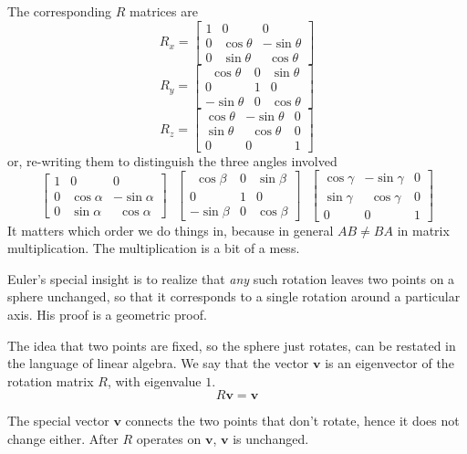 \documentclass[11pt, oneside]{article}
\begin{document}
The corresponding $R$ matrices are
\[
R_x =
\begin{bmatrix}  
1 & 0 & 0 \\  
0 & \cos \theta  & -\sin \theta \\  
0 & \sin \theta & \ \  \cos \theta
\end{bmatrix}
\]
\[
R_y = 
\begin{bmatrix}  
\ \ \cos \theta & 0 & \sin \theta \\  
0 & 1  & 0 \\  
-\sin \theta & 0 & \cos \theta
\end{bmatrix}
\]
\[
R_z =
\begin{bmatrix}  
\cos \theta  & -\sin \theta & 0 \\  
\sin \theta & \ \  \cos \theta  & 0 \\  
0 & 0 & 1
\end{bmatrix}
\]
or, re-writing them to distinguish the three angles involved
\[
\begin{bmatrix}  
1 & 0 & 0 \\  
0 & \cos \alpha  & -\sin \alpha \\  
0 & \sin \alpha & \ \  \cos \alpha
\end{bmatrix}
 \ \ \
\begin{bmatrix}  
\ \ \cos \beta & 0 & \sin \beta \\  
0 & 1  & 0 \\  
-\sin \beta & 0 & \cos \beta
\end{bmatrix}
 \ \ \
\begin{bmatrix}  
\cos \gamma  & -\sin \gamma & 0 \\  
\sin \gamma & \ \  \cos \gamma  & 0 \\  
0 & 0 & 1
\end{bmatrix}
\]
It matters which order we do things in, because in general $AB \ne BA$ in matrix multiplication.  The multiplication is a bit of a mess.

Euler's special insight is to realize that \emph{any} such rotation leaves two points on a sphere unchanged, so that it corresponds to a single rotation around a particular axis.  His proof is a geometric proof.

The idea that two points are fixed, so the sphere just rotates, can be restated in the language of linear algebra.  We say that the vector $\mathbf{v}$ is an eigenvector of the rotation matrix $R$, with eigenvalue $1$.
\[ R \mathbf{v} = \mathbf{v} \]

The special vector $\mathbf{v}$ connects the two points that don't rotate, hence it does not change either.  After $R$ operates on $\mathbf{v}$, $\mathbf{v}$ is unchanged. 
\end{document}
